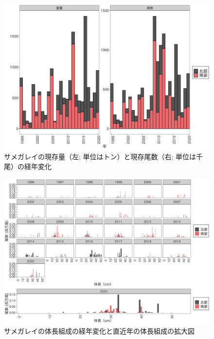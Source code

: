 \documentclass[11pt]{article} %
\begin{document}
\begin{linenumbers}
\begin{figure}[h]
  \centering
  \includegraphics[width = 14cm]{サメガレイtrend.png}
  \caption{サメガレイの現存量（左; 単位はトン）と現存尾数（右; 単位は千尾）の経年変化}
\end{figure}

\begin{figure}[h]
  \centering
  \includegraphics[width = 14cm]{サメガレイlength.png}
  \caption{サメガレイの体長組成の経年変化と直近年の体長組成の拡大図}
\end{figure}


\end{linenumbers}
\end{document}
